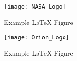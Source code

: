 \begin{minipage}[c]{0.5\textwidth}
   \begin{figure}[H]
      \centering
      \texttt{[image: NASA\_Logo]}
      \caption{Example LaTeX Figure} 
      \label{fig:NASA_Logo2}
   \end{figure}
\end{minipage}%
\begin{minipage}[c]{0.5\textwidth}
   \begin{figure}[H]
      \centering
      \texttt{[image: Orion\_Logo]}
      \caption{Example LaTeX Figure} 
      \label{fig:Orion_Logo2}
   \end{figure}
\end{minipage}